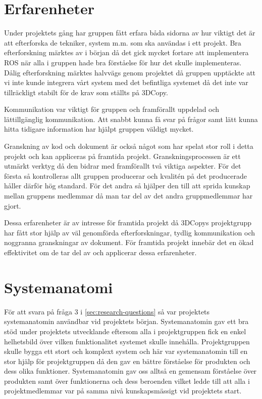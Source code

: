 \section{Erfarenheter}

Under projektets gång har gruppen fått erfara båda sidorna av hur viktigt det är att efterforska de tekniker, system m.m. som ska användas i ett projekt. Bra efterforskning märktes av i början då det gick mycket fortare att implementera ROS när alla i gruppen hade bra förståelse för hur det skulle implementeras. Dålig efterforskning märktes halvvägs genom projektet då gruppen upptäckte att vi inte kunde integrera vårt system med det befintliga systemet då det inte var tillräckligt stabilt för de krav som ställts på 3DCopy.

Kommunikation var viktigt för gruppen och framförallt uppdelad och lättillgänglig kommunikation. Att snabbt kunna få svar på frågor samt lätt kunna hitta tidigare information har hjälpt gruppen väldigt mycket.

Granskning av kod och dokument är också något som har spelat stor roll i detta projekt och kan appliceras på framtida projekt. Granskningsprocessen är ett utmärkt verktyg då den bidrar med framförallt två viktiga aspekter. För det första så kontrolleras allt gruppen producerar och kvalitén på det producerade håller därför hög standard. För det andra så hjälper den till att sprida kunskap mellan gruppens medlemmar då man tar del av det andra gruppmedlemmar har gjort.

Dessa erfarenheter är av intresse för framtida projekt då 3DCopys projektgrupp har fått stor hjälp av väl genomförda efterforskningar, tydlig kommunikation och noggranna granskningar av dokument. För framtida projekt innebär det en ökad effektivitet om de tar del av och applicerar dessa erfarenheter.

\section{Systemanatomi}
För att svara på fråga 3 i \ref{sec:research-questions} så var projektets systemanatomin användbar vid projektets början. Systemanatomin gav ett bra stöd under projektets utvecklande eftersom alla i projektgruppen fick en enkel helhetsbild över vilken funktionalitet systemet skulle innehålla. Projektgruppen skulle bygga ett stort och komplext system och här var systemanatomin till en stor hjälp för projektgruppen då den gav en bättre förståelse för produkten och dess olika funktioner. Systemanatomin gav oss alltså en gemensam förståelse över produkten samt över funktionerna och dess beroenden vilket ledde till att alla i projektmedlemmar var på samma nivå kunskapsmässigt vid projektets start.

